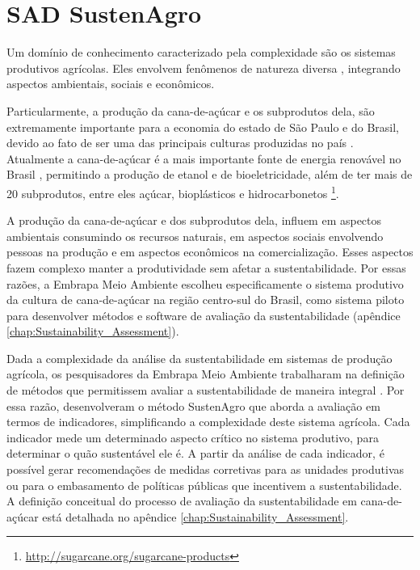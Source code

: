 \section{SAD SustenAgro\label{sec:SAD-SustenAgro}}

Um domínio de conhecimento caracterizado pela complexidade são os
sistemas produtivos agrícolas. Eles envolvem fenômenos de natureza
diversa \citep{simon1991architecture}, integrando aspectos ambientais,
sociais e econômicos.

Particularmente, a produção da cana-de-açúcar e os subprodutos dela,
são extremamente importante para a economia do estado de São Paulo
e do Brasil, devido ao fato de ser uma das principais culturas produzidas
no país \citep{Storquato2015}. Atualmente a cana-de-açúcar é a mais
importante fonte de energia renovável no Brasil \citep{seabra2011life},
permitindo a produção de etanol e de bioeletricidade, além de ter
mais de 20 subprodutos, entre eles açúcar, bioplásticos e hidrocarbonetos
\footnote{\url{http://sugarcane.org/sugarcane-products}}. 

A produção da cana-de-açúcar e dos subprodutos dela, influem em aspectos
ambientais consumindo os recursos naturais, em aspectos sociais envolvendo
pessoas na produção e em aspectos econômicos na comercialização. Esses
aspectos fazem complexo manter a produtividade sem afetar a sustentabilidade.
Por essas razões, a Embrapa Meio Ambiente escolheu especificamente
o sistema produtivo da cultura de cana-de-açúcar na região centro-sul
do Brasil, como sistema piloto para desenvolver métodos e software
de avaliação da sustentabilidade (apêndice \ref{chap:Sustainability_Assessment}).

Dada a complexidade da análise da sustentabilidade em sistemas de
produção agrícola, os pesquisadores da Embrapa Meio Ambiente trabalharam
na definição de métodos que permitissem avaliar a sustentabilidade
de maneira integral \citep{Singh2012281}. Por essa razão, desenvolveram
o método SustenAgro que aborda a avaliação em termos de indicadores,
simplificando a complexidade deste sistema agrícola. Cada indicador
mede um determinado aspecto crítico no sistema produtivo, para determinar
o quão sustentável ele é. A partir da análise de cada indicador, é
possível gerar recomendações de medidas corretivas para as unidades
produtivas ou para o embasamento de políticas públicas que incentivem
a sustentabilidade. A definição conceitual do processo de avaliação
da sustentabilidade em cana-de-açúcar está detalhada no apêndice \ref{chap:Sustainability_Assessment}. 

